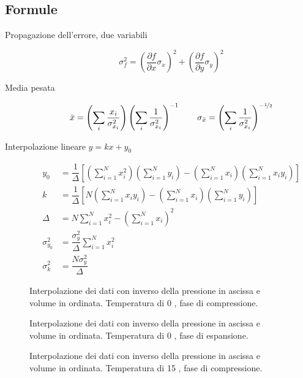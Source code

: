 \documentclass[italian,a4paper]{article}
\begin{document}
\subsection*{Formule}
\begin{description}
 \item[Propagazione dell'errore, due variabili]
\begin{equation*}
 \sigma_f^2 = \left(\dfrac{\partial f}{\partial x}\sigma_x\right)^2 + \left(\dfrac{\partial f}{\partial y}\sigma_y\right)^2
\end{equation*}
 \item[Media pesata]
\begin{equation*}
 \bar{x}=\left(\sum_i \dfrac{x_i}{\sigma_{x_i}^2} \right)\left(\sum_i \dfrac{1}{\sigma_{x_i}^2} \right)^{-1} \qquad \sigma_{\bar{x}} = \left(\sum_i \dfrac{1}{\sigma_{x_i}^2} \right)^{-\nicefrac 1 2}
\end{equation*}
\item[Interpolazione lineare $y=kx+y_0$]
\begin{align*}
y_0 &= \dfrac{1}{\Delta}\left[ \left(\sum_{i=1}^Nx_i^2\right) \left(\sum_{i=1}^Ny_i\right)-\left(\sum_{i=1}^Nx_i\right)\left(\sum_{i=1}^Nx_iy_i\right)\right]\\[3pt]
k &= \dfrac{1}{\Delta}\left[N \left(\sum_{i=1}^Nx_iy_i\right)-\left(\sum_{i=1}^Nx_i\right)\left(\sum_{i=1}^Ny_i\right)\right]\\[3pt]
\Delta &= N\sum_{i=1}^Nx_i^2 - \left(\sum_{i=1}^Nx_i\right)^2\\[6pt]
\sigma_{y_0}^2 &= \dfrac{\sigma_y^2}{\Delta}\sum_{i=1}^Nx_i^2\\[3pt]
\sigma_k^2 &= \dfrac{N\sigma_y^2}{\Delta}
\end{align*}
\end{description}
\begin{figure}[p]\caption{Interpolazione dei dati con inverso della pressione in ascissa e volume in ordinata. Temperatura di 0 \celsius, fase di compressione.}\label{0c}

\end{figure}
\begin{figure}[p]\caption{Interpolazione dei dati con inverso della pressione in ascissa e volume in ordinata. Temperatura di 0 \celsius, fase di espansione.}\label{0e}

\end{figure}
\begin{figure}[p]\caption{Interpolazione dei dati con inverso della pressione in ascissa e volume in ordinata. Temperatura di 15 \celsius, fase di compressione.}\label{15c}

\end{figure}
\end{document}
